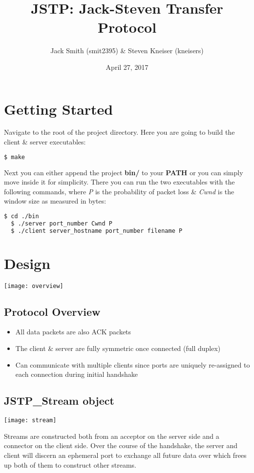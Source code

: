 \documentclass{article}
\title{JSTP: Jack-Steven Transfer Protocol}
\author{Jack Smith (smit2395) \& Steven Kneiser (kneisers)}
\date{April 27, 2017}
\begin{document}
\maketitle

\section{Getting Started}
Navigate to the root of the project directory. Here you are going to build the client \& server executables:
\begin{lstlisting}[language=bash]
  $ make
\end{lstlisting}

\vspace{4mm}
Next you can either append the project \textbf{bin/} to your \textbf{PATH} or you can simply move inside it for simplicity.
There you can run the two executables with the following commands, where \emph{P} is the probability of packet loss \& \emph{Cwnd} is the window size as measured in bytes:
\begin{lstlisting}[language=bash]
  $ cd ./bin
  $ ./server port_number Cwnd P
  $ ./client server_hostname port_number filename P
\end{lstlisting}

\section{Design}
\texttt{[image: overview]}

\subsection{Protocol Overview}
\begin{itemize}
    \item All data packets are also ACK packets
    \item The client \& server are fully symmetric once connected (full duplex)
    \item Can communicate with multiple clients since ports are uniquely re-assigned to each connection during initial handshake
\end{itemize}

\subsection{JSTP\_Stream object}
\texttt{[image: stream]}

Streams are constructed both from an acceptor on the server side and a connector on the client side.
Over the course of the handshake, the server and client will discern an ephemeral port to exchange all future data over which frees up both of them to construct other streams.
\end{document}
